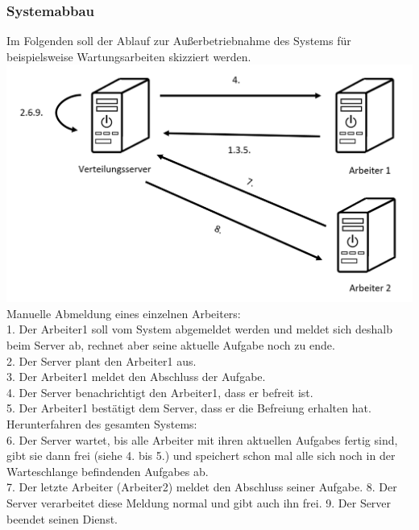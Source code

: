 \documentclass[a4paper,12pt]{article}
\begin{document}
\begin{minipage}[t]{\linewidth}
\subsubsection{Systemabbau}
Im Folgenden soll der Ablauf zur Außerbetriebnahme des Systems für beispielsweise Wartungsarbeiten skizziert werden.\\

\includegraphics[width=\linewidth]{Systemmodelle/Models/Shutdown.PNG}
\\
Manuelle Abmeldung eines einzelnen \gls{Arbeiter}s:\\
1. Der \gls{Arbeiter}1 soll vom System abgemeldet werden und meldet sich deshalb beim \gls{Server} ab, rechnet aber seine aktuelle \gls{Aufgabe} noch zu ende.\\
2. Der \gls{Server} plant den \gls{Arbeiter}1 aus.\\
3. Der \gls{Arbeiter}1 meldet den Abschluss der \gls{Aufgabe}.\\
4. Der \gls{Server} benachrichtigt den \gls{Arbeiter}1, dass er befreit ist.\\
5. Der \gls{Arbeiter}1 bestätigt dem \gls{Server}, dass er die Befreiung erhalten hat.\\
Herunterfahren des gesamten Systems:\\
6. Der \gls{Server} wartet, bis alle \gls{Arbeiter} mit ihren aktuellen \glspl{Aufgabe} fertig sind, gibt sie dann frei (siehe 4. bis 5.) und speichert schon mal alle sich noch in der \gls{Warteschlange} befindenden \glspl{Aufgabe} ab.\\
7. Der letzte \gls{Arbeiter} (\gls{Arbeiter}2) meldet den Abschluss seiner \gls{Aufgabe}.
8. Der \gls{Server} verarbeitet diese Meldung normal und gibt auch ihn frei.
9. Der \gls{Server} beendet seinen Dienst.

\end{minipage}
\end{document}

